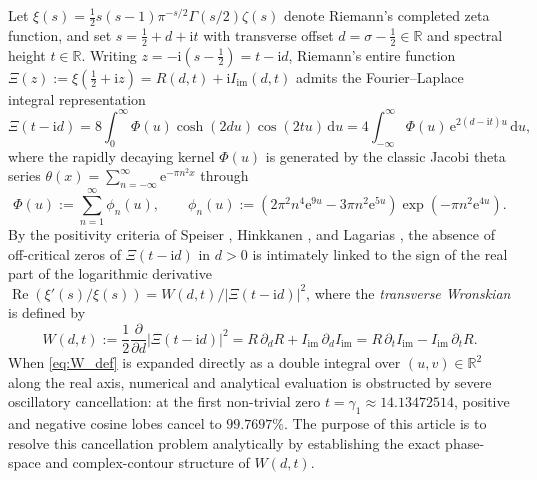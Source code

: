 \documentclass[11pt,a4paper,reqno]{amsart}
\theoremstyle{definition}
\theoremstyle{remark}
\numberwithin{equation}{section}
\newcommand{\dd}{\mathrm{d}}
\newcommand{\ii}{\mathrm{i}}
\newcommand{\ee}{\mathrm{e}}
\newcommand{\Rea}{\operatorname{Re}}
\begin{document}
Let $\xi(s) = \frac{1}{2}s(s-1)\pi^{-s/2}\Gamma(s/2)\zeta(s)$ denote Riemann's completed zeta function, and set $s = \frac{1}{2} + d + \ii t$ with transverse offset $d = \sigma - \frac{1}{2} \in \mathbb{R}$ and spectral height $t \in \mathbb{R}$. Writing $z = -\ii(s - \frac{1}{2}) = t - \ii d$, Riemann's entire function $\Xi(z) := \xi(\frac{1}{2} + \ii z) = R(d,t) + \ii I_{\mathrm{im}}(d,t)$ admits the Fourier--Laplace integral representation \cite{Riemann1859,Polya1926,Titchmarsh1986}
\begin{equation}\label{eq:Xi_integral}
\Xi(t - \ii d) = 8\int_0^\infty \Phi(u)\cosh(2d u)\cos(2t u)\,\dd u = 4\int_{-\infty}^\infty \Phi(u)\,\ee^{2(d - \ii t)u}\,\dd u,
\end{equation}
where the rapidly decaying kernel $\Phi(u)$ is generated by the classic Jacobi theta series $\theta(x) = \sum_{n=-\infty}^\infty \ee^{-\pi n^2 x}$ through
\begin{equation}\label{eq:Phi_def}
\Phi(u) := \sum_{n=1}^\infty \phi_n(u), \qquad \phi_n(u) := \left(2\pi^2 n^4 \ee^{9u} - 3\pi n^2 \ee^{5u}\right)\exp\!\left(-\pi n^2 \ee^{4u}\right).
\end{equation}
By the positivity criteria of Speiser \cite{Speiser1934}, Hinkkanen \cite{Hinkkanen1997}, and Lagarias \cite{Lagarias1999}, the absence of off-critical zeros of $\Xi(t-\ii d)$ in $d > 0$ is intimately linked to the sign of the real part of the logarithmic derivative $\Rea(\xi'(s)/\xi(s)) = W(d,t)/|\Xi(t-\ii d)|^2$, where the \emph{transverse Wronskian} is defined by
\begin{equation}\label{eq:W_def}
W(d,t) := \frac{1}{2}\frac{\partial}{\partial d}\big|\Xi(t-\ii d)\big|^2 = R\,\partial_d R + I_{\mathrm{im}}\,\partial_d I_{\mathrm{im}} = R\,\partial_t I_{\mathrm{im}} - I_{\mathrm{im}}\,\partial_t R.
\end{equation}
When \eqref{eq:W_def} is expanded directly as a double integral over $(u,v) \in \mathbb{R}^2$ along the real axis, numerical and analytical evaluation is obstructed by severe oscillatory cancellation: at the first non-trivial zero $t = \gamma_1 \approx 14.13472514$, positive and negative cosine lobes cancel to $99.7697\%$. The purpose of this article is to resolve this cancellation problem analytically by establishing the exact phase-space and complex-contour structure of $W(d,t)$.
\end{document}
